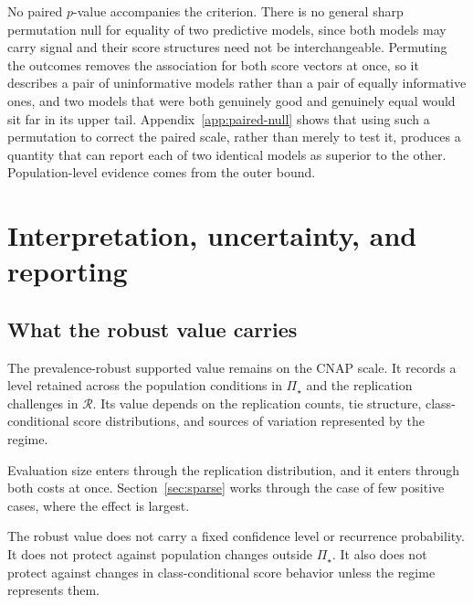 \documentclass[11pt]{article}
\newcommand{\Regime}{\mathcal{R}}
\newcommand{\PSet}{\Pi_\star}
\theoremstyle{remark}
\begin{document}
No paired $p$-value accompanies the criterion. There is no general sharp permutation null for equality of two predictive models, since both models may carry signal and their score structures need not be interchangeable. Permuting the outcomes removes the association for both score vectors at once, so it describes a pair of uninformative models rather than a pair of equally informative ones, and two models that were both genuinely good and genuinely equal would sit far in its upper tail. Appendix~\ref{app:paired-null} shows that using such a permutation to correct the paired scale, rather than merely to test it, produces a quantity that can report each of two identical models as superior to the other. Population-level evidence comes from the outer bound.

\section{Interpretation, uncertainty, and reporting}
\label{sec:reporting}

\subsection{What the robust value carries}

The prevalence-robust supported value remains on the CNAP scale. It records a level retained across the population conditions in $\PSet$ and the replication challenges in $\Regime$. Its value depends on the replication counts, tie structure, class-conditional score distributions, and sources of variation represented by the regime.

Evaluation size enters through the replication distribution, and it enters through both costs at once. Section~\ref{sec:sparse} works through the case of few positive cases, where the effect is largest.

The robust value does not carry a fixed confidence level or recurrence probability. It does not protect against population changes outside $\PSet$. It also does not protect against changes in class-conditional score behavior unless the regime represents them.
\end{document}
